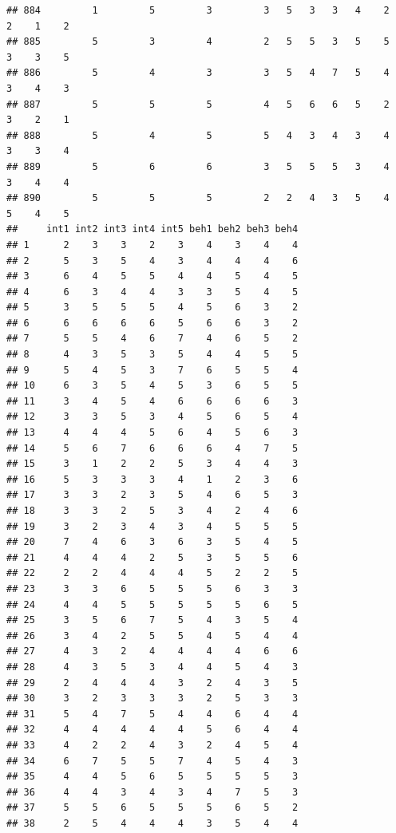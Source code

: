 \documentclass[
]{article}
\begin{document}
\begin{verbatim}
## 884         1         5         3         3   5   3   3   4    2    2    1    2
## 885         5         3         4         2   5   5   3   5    5    3    3    5
## 886         5         4         3         3   5   4   7   5    4    3    4    3
## 887         5         5         5         4   5   6   6   5    2    3    2    1
## 888         5         4         5         5   4   3   4   3    4    3    3    4
## 889         5         6         6         3   5   5   5   3    4    3    4    4
## 890         5         5         5         2   2   4   3   5    4    5    4    5
##     int1 int2 int3 int4 int5 beh1 beh2 beh3 beh4
## 1      2    3    3    2    3    4    3    4    4
## 2      5    3    5    4    3    4    4    4    6
## 3      6    4    5    5    4    4    5    4    5
## 4      6    3    4    4    3    3    5    4    5
## 5      3    5    5    5    4    5    6    3    2
## 6      6    6    6    6    5    6    6    3    2
## 7      5    5    4    6    7    4    6    5    2
## 8      4    3    5    3    5    4    4    5    5
## 9      5    4    5    3    7    6    5    5    4
## 10     6    3    5    4    5    3    6    5    5
## 11     3    4    5    4    6    6    6    6    3
## 12     3    3    5    3    4    5    6    5    4
## 13     4    4    4    5    6    4    5    6    3
## 14     5    6    7    6    6    6    4    7    5
## 15     3    1    2    2    5    3    4    4    3
## 16     5    3    3    3    4    1    2    3    6
## 17     3    3    2    3    5    4    6    5    3
## 18     3    3    2    5    3    4    2    4    6
## 19     3    2    3    4    3    4    5    5    5
## 20     7    4    6    3    6    3    5    4    5
## 21     4    4    4    2    5    3    5    5    6
## 22     2    2    4    4    4    5    2    2    5
## 23     3    3    6    5    5    5    6    3    3
## 24     4    4    5    5    5    5    5    6    5
## 25     3    5    6    7    5    4    3    5    4
## 26     3    4    2    5    5    4    5    4    4
## 27     4    3    2    4    4    4    4    6    6
## 28     4    3    5    3    4    4    5    4    3
## 29     2    4    4    4    3    2    4    3    5
## 30     3    2    3    3    3    2    5    3    3
## 31     5    4    7    5    4    4    6    4    4
## 32     4    4    4    4    4    5    6    4    4
## 33     4    2    2    4    3    2    4    5    4
## 34     6    7    5    5    7    4    5    4    3
## 35     4    4    5    6    5    5    5    5    3
## 36     4    4    3    4    3    4    7    5    3
## 37     5    5    6    5    5    5    6    5    2
## 38     2    5    4    4    4    3    5    4    4

\end{verbatim}
\end{document}
